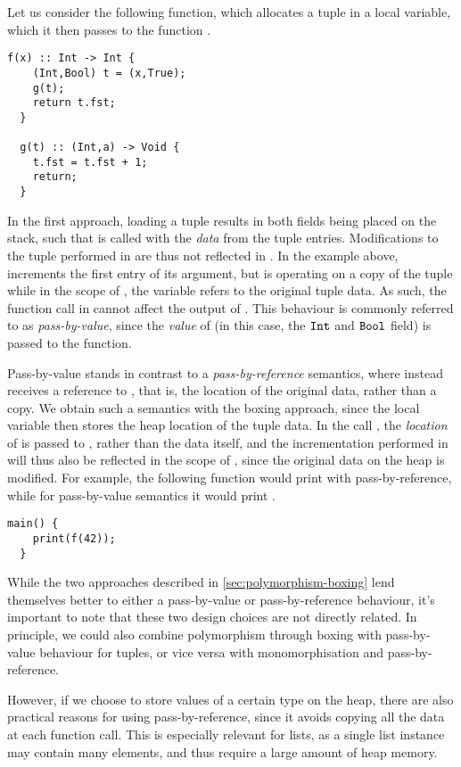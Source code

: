 Let us consider the following function, which allocates a tuple in a local
variable, which it then passes to the function .
%
\begin{lstlisting}[language=spl]
  f(x) :: Int -> Int {
    (Int,Bool) t = (x,True);
    g(t);
    return t.fst;
  }

  g(t) :: (Int,a) -> Void {
    t.fst = t.fst + 1;
    return;
  }
\end{lstlisting}
%
In the first approach, loading a tuple results in both fields being placed on
the stack, such that  is called with the \emph{data} from the tuple entries.
Modifications to the tuple performed in  are thus not reflected in
. In the example above,  increments the first entry of its
argument, but  is operating on a copy of the tuple while in the scope of
, the variable  refers to the original tuple data.
As such, the function call  in  cannot affect the output of
. This behaviour is commonly referred to as \emph{pass-by-value}, since
the \emph{value} of  (in this case, the $\texttt{Int}$ and $\texttt{Bool}$ field) is
passed to the function.

Pass-by-value stands in contrast to a \emph{pass-by-reference} semantics, where
 instead receives a reference to , that is, the location of the
original data, rather than a copy.
We obtain such a semantics with the boxing approach, since the local variable
 then stores the heap location of the tuple data. In the call ,
the \emph{location} of  is passed to , rather than the data itself,
and the incrementation performed in  will thus also be reflected in the
scope of , since the original data on the heap is modified.
For example, the following  function would print  with
pass-by-reference, while for pass-by-value semantics it would print .
%
\begin{lstlisting}[language=spl]
  main() {
    print(f(42));
  }
\end{lstlisting}

While the two approaches described in \cref{sec:polymorphism-boxing} lend
themselves better to either a pass-by-value or pass-by-reference behaviour, it's
important to note that these two design choices are not directly related.
In principle, we could also combine polymorphism through boxing with
pass-by-value behaviour for tuples, or vice versa with monomorphisation and
pass-by-reference.

However, if we choose to store values of a certain type on the heap, there are
also practical reasons for using pass-by-reference, since it avoids copying all
the data at each function call.
This is especially relevant for lists, as a single list instance may contain
many elements, and thus require a large amount of heap memory.


